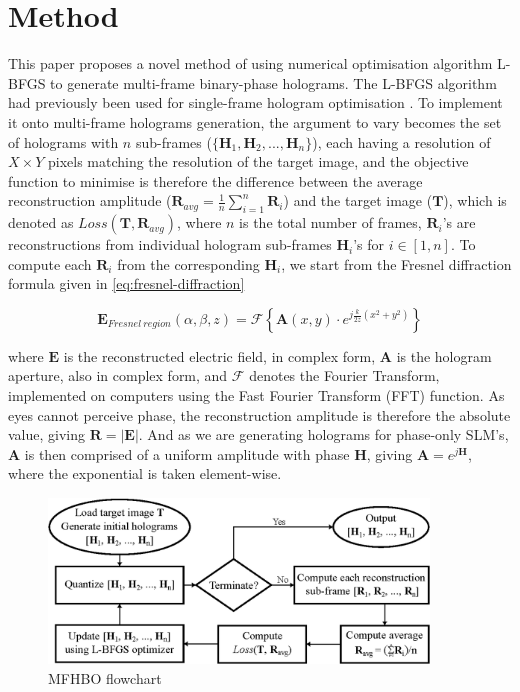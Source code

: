 \section{Method}
	This paper proposes a novel method of using numerical optimisation algorithm L-BFGS \cite{Liu1989} to generate multi-frame binary-phase holograms. The L-BFGS algorithm had previously been used for single-frame hologram optimisation \cite{Sha2022, Sha2023}. To implement it onto multi-frame holograms generation, the argument to vary becomes the set of holograms with $n$ sub-frames ($\{\textbf{H}_1, \textbf{H}_2, ..., \textbf{H}_n\}$), each having a resolution of $X\times Y$ pixels matching the resolution of the target image, and the objective function to minimise is therefore the difference between the average reconstruction amplitude ($\textbf{R}_{avg}=\frac{1}{n}\sum_{i=1}^n\textbf{R}_i$) and the target image ($\textbf{T}$), which is denoted as $Loss(\textbf{T}, \textbf{R}_{avg})$, where $n$ is the total number of frames, $\textbf{R}_i$'s are reconstructions from individual hologram sub-frames $\textbf{H}_i$'s for $i\in[1,n]$. To compute each $\textbf{R}_i$ from the corresponding $\textbf{H}_i$, we start from the Fresnel diffraction formula given in \cref{eq:fresnel-diffraction} \cite{Goodman2017}

	\begin{equation}
	  \textbf{E}_{Fresnel\ region}(\alpha, \beta, z) = \mathcal{F} \left\{\textbf{A}(x,y) \cdot e^{j\frac{k}{2z}(x^2+y^2)}\right\} \label{eq:fresnel-diffraction}
	\end{equation}

	where $\textbf{E}$ is the reconstructed electric field, in complex form, $\textbf{A}$ is the hologram aperture, also in complex form, and $\mathcal{F}$ denotes the Fourier Transform, implemented on computers using the Fast Fourier Transform (FFT) function. As eyes cannot perceive phase, the reconstruction amplitude is therefore the absolute value, giving $\textbf{R} = \left\lvert \textbf{E} \right\rvert$. And as we are generating holograms for phase-only SLM's, $\textbf{A}$ is then comprised of a uniform amplitude with phase \textbf{H}, giving $\textbf{A} = e^{j\textbf{H}}$, where the exponential is taken element-wise.

	\begin{figure}[h!t]
		\centering
		\includegraphics[width=0.9\textwidth]{MFHO_flowchart.eps}
		\caption{MFHBO flowchart}
		\label{fig:MFHO_flowchart}
	\end{figure}

